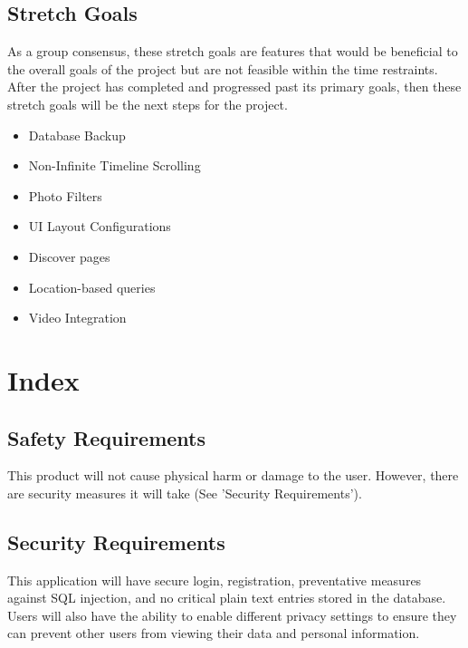 \documentclass[letterpaper, 10, draftclsnofoot, onecolumn]{IEEEtran}
\begin{document}

\subsection{Stretch Goals}
As a group consensus, these stretch goals are features that would be beneficial to the overall goals of the project but are not feasible within the time restraints. After the project has completed and progressed past its primary goals, then these stretch goals will be the next steps for the project.
\begin{itemize}
\item Database Backup
\item Non-Infinite Timeline Scrolling
\item Photo Filters
\item UI Layout Configurations
\item Discover pages
\item Location-based queries
\item Video Integration
\end{itemize}

\section{Index}

\subsection{Safety Requirements}
This product will not cause physical harm or damage to the user. However, there are security measures it will take (See 'Security Requirements').

\subsection{Security Requirements}
This application will have secure login, registration, preventative measures against SQL injection, and no critical plain text entries stored in the database. Users will also have the ability to enable different privacy settings to ensure they can prevent other users from viewing their data and personal information. 
\end{document}
